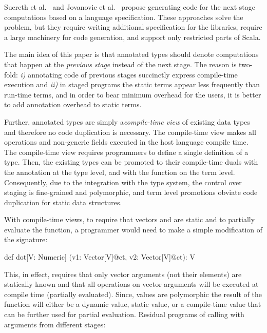 Suereth et al.~\cite{forge} and Jovanovic et al.~\cite{yin-yang}
 propose generating code for the next stage computations based on
 a language specification. These approaches solve the problem,
 but they require writing additional specification for the libraries,
 require a large machinery for code generation,
 and support only restricted parts of Scala.

The main idea of this paper is that annotated types should denote computations
 that happen at the \emph{previous stage} instead of the next stage.
 The reason is two-fold: \emph{i)} annotating code of previous stages succinctly
 express compile-time execution and \emph{ii)} in staged programs the static terms
 appear less frequently than run-time terms, and in order to bear minimum overhead
 for the users, it is better to add annotation overhead to static terms.

Further, annotated types are simply a\emph{compile-time view}
 of existing data types and therefore no code duplication is necessary.
 The compile-time view makes all operations and non-generic fields executed in
 the host language compile time. The compile-time view requires programmers to
 define a single definition of a type. Then, the existing types can be promoted
 to their compile-time duals with the  annotation at the type level,
 and with the  function on the term level. Consequently, due to the
 integration with the type system, the control over staging is
 fine-grained and polymorphic, and term level promotions obviate code duplication
 for static data structures.

With compile-time views, to require that vectors  and  are
 static and to partially evaluate the function, a programmer would need to make
 a simple modification of the  signature:\begin{lstparagraph}
def dot[V: Numeric]
  (v1: Vector[V]@ct, v2: Vector[V]@ct): V
\end{lstparagraph}

This, in effect, requires that only vector arguments (not their elements) are
 statically known and that all operations on vector arguments will be executed
 at compile time (partially evaluated). Since, values are polymorphic the result
 of the function will either be a dynamic value, static value, or a compile-time value
 that can be further used for partial evaluation. Residual programs of calling 
 with arguments from different stages:

